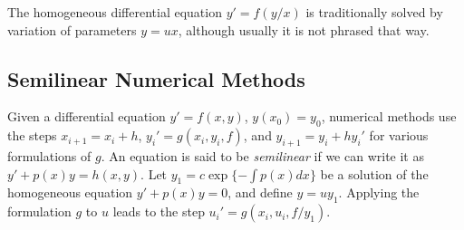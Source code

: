 \documentclass{article}
\begin{document}
The homogeneous differential equation $y'=f(y/x)$ is traditionally solved by variation of parameters $y=ux$, although usually it is not phrased that way. 

\subsection{Semilinear Numerical Methods}

Given a differential equation $y'=f(x,y)$, $y(x_0)=y_0$, numerical methods use the steps $x_{i+1}=x_i+h$, $y_i'=g(x_i,y_i,f)$, and $y_{i+1}=y_i+hy_i'$ for various formulations of $g$.
An equation is said to be \textit{semilinear} if we can write it as $y'+p(x)y=h(x,y)$.
Let $y_1=c\exp\{-\int p(x)dx\}$ be a solution of the homogeneous equation $y'+p(x)y=0$, and define $y=uy_1$.
Applying the formulation $g$ to $u$ leads to the step $u_i'=g(x_i,u_i,f/y_1)$.
\end{document}

